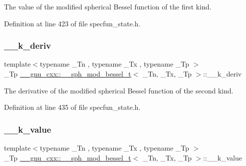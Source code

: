 The value of the modified spherical Bessel function of the first kind. 



Definition at line 423 of file specfun\+\_\+state.\+h.

\mbox{\label{struct____gnu__cxx_1_1____sph__mod__bessel__t_a4a291581457934e9d05c21e2acbedbc5}} 
\subsubsection{\texorpdfstring{\+\_\+\+\_\+k\+\_\+deriv}{\_\_k\_deriv}}
{\footnotesize\ttfamily template$<$typename \+\_\+\+Tn , typename \+\_\+\+Tx , typename \+\_\+\+Tp $>$ \\
\+\_\+\+Tp \hyperlink{struct____gnu__cxx_1_1____sph__mod__bessel__t}{\+\_\+\+\_\+gnu\+\_\+cxx\+::\+\_\+\+\_\+sph\+\_\+mod\+\_\+bessel\+\_\+t}$<$ \+\_\+\+Tn, \+\_\+\+Tx, \+\_\+\+Tp $>$\+::\+\_\+\+\_\+k\+\_\+deriv}



The derivative of the modified spherical Bessel function of the second kind. 



Definition at line 435 of file specfun\+\_\+state.\+h.

\mbox{\label{struct____gnu__cxx_1_1____sph__mod__bessel__t_af0e430aef3e7053de5474206d6f13830}} 
\subsubsection{\texorpdfstring{\+\_\+\+\_\+k\+\_\+value}{\_\_k\_value}}
{\footnotesize\ttfamily template$<$typename \+\_\+\+Tn , typename \+\_\+\+Tx , typename \+\_\+\+Tp $>$ \\
\+\_\+\+Tp \hyperlink{struct____gnu__cxx_1_1____sph__mod__bessel__t}{\+\_\+\+\_\+gnu\+\_\+cxx\+::\+\_\+\+\_\+sph\+\_\+mod\+\_\+bessel\+\_\+t}$<$ \+\_\+\+Tn, \+\_\+\+Tx, \+\_\+\+Tp $>$\+::\+\_\+\+\_\+k\+\_\+value}



